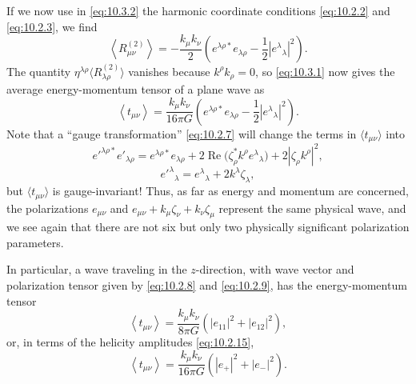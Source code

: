 If we now use in \eqref{eq:10.3.2} the harmonic coordinate conditions
\eqref{eq:10.2.2} and \eqref{eq:10.2.3}, we find
\begin{equation}
  \left\langle R^{(2)}_{\mu\nu}\right\rangle
  =
  -\frac{k_\mu k_\nu}{2}
  \left(
    e^{\lambda\rho*}e_{\lambda\rho}
    -\frac12\left|e^\lambda{}_\lambda\right|^2
  \right).
  \tag{10.3.4}\label{eq:10.3.4}
\end{equation}
The quantity
\(\eta^{\lambda\rho}\langle R^{(2)}_{\lambda\rho}\rangle\) vanishes because
\(k^\rho k_\rho=0\), so \eqref{eq:10.3.1} now gives the average
energy-momentum tensor of a plane wave as
\begin{equation}
  \left\langle t_{\mu\nu}\right\rangle
  =
  \frac{k_\mu k_\nu}{16\pi G}
  \left(
    e^{\lambda\rho*}e_{\lambda\rho}
    -\frac12\left|e^\lambda{}_\lambda\right|^2
  \right).
  \tag{10.3.5}\label{eq:10.3.5}
\end{equation}
Note that a ``gauge transformation'' \eqref{eq:10.2.7} will change the
terms in \(\langle t_{\mu\nu}\rangle\) into
\[
  e'^{\lambda\rho*}e'_{\lambda\rho}
  =
  e^{\lambda\rho*}e_{\lambda\rho}
  +2\operatorname{Re}
    \bigl(\zeta_\rho^*k^\rho e^\lambda{}_\lambda\bigr)
  +2\left|\zeta_\rho k^\rho\right|^2,
\]
\[
  e'^\lambda{}_\lambda
  =
  e^\lambda{}_\lambda+2k^\lambda\zeta_\lambda,
\]
but \(\langle t_{\mu\nu}\rangle\) is gauge-invariant! Thus, as far as energy
and momentum are concerned, the polarizations \(e_{\mu\nu}\) and
\(e_{\mu\nu}+k_\mu\zeta_\nu+k_\nu\zeta_\mu\) represent the same physical
wave, and we see again that there are not six but only two physically
significant polarization parameters.

In particular, a wave traveling in the \(z\)-direction, with wave vector and
polarization tensor given by \eqref{eq:10.2.8} and \eqref{eq:10.2.9}, has
the energy-momentum tensor
\begin{equation}
  \left\langle t_{\mu\nu}\right\rangle
  =
  \frac{k_\mu k_\nu}{8\pi G}
  \left(\left|e_{11}\right|^2+\left|e_{12}\right|^2\right),
  \tag{10.3.6}\label{eq:10.3.6}
\end{equation}
or, in terms of the helicity amplitudes \eqref{eq:10.2.15},
\begin{equation}
  \left\langle t_{\mu\nu}\right\rangle
  =
  \frac{k_\mu k_\nu}{16\pi G}
  \left(\left|e_+\right|^2+\left|e_-\right|^2\right).
  \tag{10.3.7}\label{eq:10.3.7}
\end{equation}
